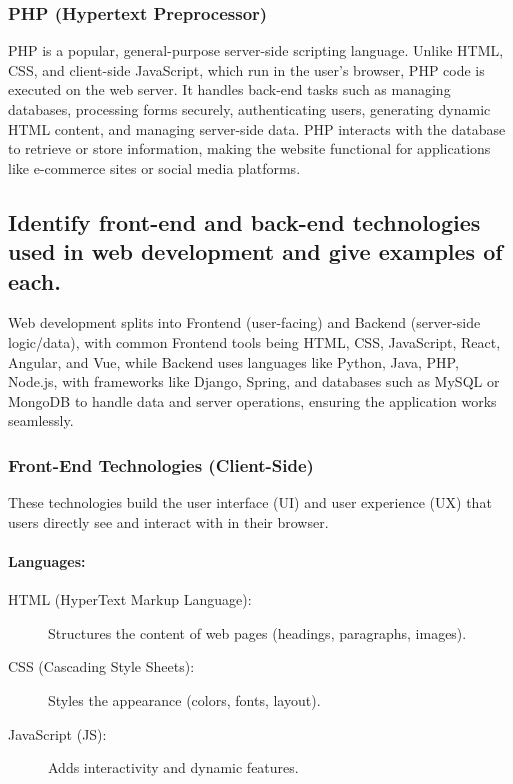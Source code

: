 \documentclass[a4paper,12pt]{article}
\begin{document}
\subsubsection{PHP (Hypertext Preprocessor)}
PHP is a popular, general-purpose server-side scripting language. Unlike HTML, CSS, and client-side JavaScript, which run in the user's browser, PHP code is executed on the web server. It handles back-end tasks such as managing databases, processing forms securely, authenticating users, generating dynamic HTML content, and managing server-side data. PHP interacts with the database to retrieve or store information, making the website functional for applications like e-commerce sites or social media platforms.

\subsection{Identify front-end and back-end technologies used in web development and give examples of each.}

Web development splits into Frontend (user-facing) and Backend (server-side logic/data), with common Frontend tools being HTML, CSS, JavaScript, React, Angular, and Vue, while Backend uses languages like Python, Java, PHP, Node.js, with frameworks like Django, Spring, and databases such as MySQL or MongoDB to handle data and server operations, ensuring the application works seamlessly.

\subsubsection{Front-End Technologies (Client-Side)}
These technologies build the user interface (UI) and user experience (UX) that users directly see and interact with in their browser.

\paragraph{Languages:}
\begin{description}
    \item[HTML (HyperText Markup Language):] Structures the content of web pages (headings, paragraphs, images).
    \item[CSS (Cascading Style Sheets):] Styles the appearance (colors, fonts, layout).
    \item[JavaScript (JS):] Adds interactivity and dynamic features.
\end{description}
\end{document}
